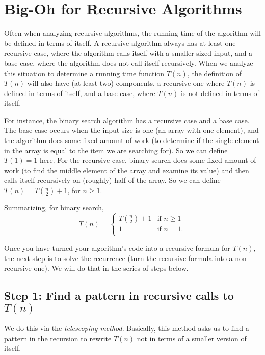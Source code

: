 \documentclass [letterpaper,12pt]{article}
\begin{document}
\section*{Big-Oh for Recursive Algorithms}

Often when analyzing recursive algorithms, the running time of the algorithm will be defined 
in terms of itself.  A recursive algorithm always has at least one recursive case, where the algorithm
calls itself with a smaller-sized input, and a base case, where the algorithm does not call itself 
recursively.  When we analyze this situation to determine a running time function $T(n)$, 
the definition of $T(n)$ will also have (at least two) components, a recursive one where $T(n)$ is defined 
in terms of itself, and a base case, where $T(n)$ is not defined in terms of itself.

For instance, the binary search algorithm has a recursive case and a base case.  The base case occurs when the input
size is one (an array with one element), and the algorithm does some fixed amount of work (to determine
if the single element in the array is equal to the item we are searching for).  So we can define $T(1)=1$ here.
For the recursive case, binary search does some fixed amount of work (to find the middle element of the array and 
examine its value) and then calls itself recursively on (roughly) half of the array.  So we can define
$T(n)=T(\frac{n}{2}) + 1$, for $n \geq 1$.

Summarizing, for binary search, 
\[ 
T(n) = \begin{cases}

T(\frac{n}{2}) + 1 & \text{if } n \geq 1 \\
1 &\text{if } n=1.\\
\end{cases} 
\]

Once you have turned your algorithm's code into a recursive formula for $T(n)$, the next step is
to solve the recurrence (turn the recursive formula into a non-recursive one).  We will do that in the series of
steps below.

\subsection*{Step 1: Find a pattern in recursive calls to $T(n)$}

We do this via the \emph{telescoping method}.  Basically, this method asks us to find a pattern in the recursion to 
rewrite $T(n)$ not in terms of a smaller version of itself.
\end{document}
